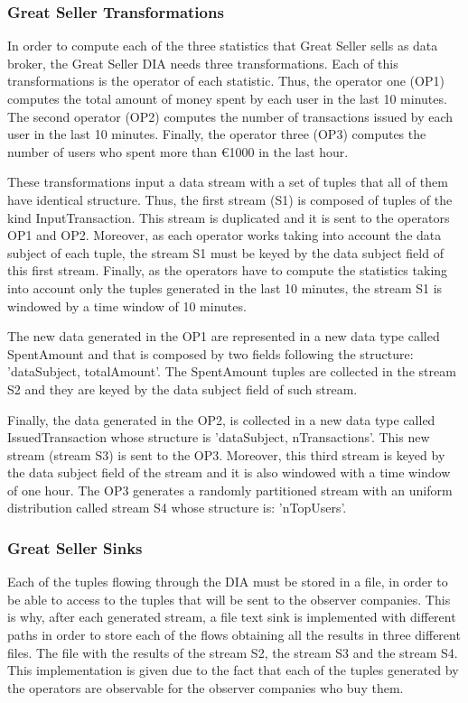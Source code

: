 \subsubsection*{Great Seller Transformations}
In order to compute each of the three statistics that Great Seller sells as data broker, the Great Seller DIA needs three transformations. Each of this transformations is the operator of each statistic. Thus, the operator one (OP1) computes the total amount of money spent by each user in the last 10 minutes. The second operator (OP2) computes the number of transactions issued by each user in the last 10 minutes. Finally, the operator three (OP3) computes the number of users who spent more than \euro{1000} in the last hour.

These transformations input a data stream with a set of tuples that all of them have identical structure. Thus, the first stream (S1) is composed of tuples of the kind InputTransaction. This stream is duplicated and it is sent to the operators OP1 and OP2. Moreover, as each operator works taking into account the data subject of each tuple, the stream S1 must be keyed by the data subject field of this first stream. Finally, as the operators have to compute the statistics taking into account only the tuples generated in the last 10 minutes, the stream S1 is windowed by a time window of 10 minutes.

The new data generated in the OP1 are represented in a new data type called SpentAmount and that is composed by two fields following the structure: 'dataSubject, totalAmount'. The SpentAmount tuples are collected in the stream S2 and they are keyed by the data subject field of such stream.

Finally, the data generated in the OP2, is collected in a new data type called IssuedTransaction whose structure is 'dataSubject, nTransactions'. This new stream (stream S3) is sent to the OP3. Moreover, this third stream is keyed by the data subject field of the stream and it is also windowed with a time window of one hour. The OP3 generates a randomly partitioned stream with an uniform distribution called stream S4 whose structure is: 'nTopUsers'.

\subsubsection*{Great Seller Sinks}
Each of the tuples flowing through the DIA must be stored in a file, in order to be able to access to the tuples that will be sent to the observer companies. This is why, after each generated stream, a file text sink is implemented with different paths in order to store each of the flows obtaining all the results in three different files. The file with the results of the stream S2, the stream S3 and the stream S4.
This implementation is given due to the fact that each of the tuples generated by the operators are observable for the observer companies who buy them.

